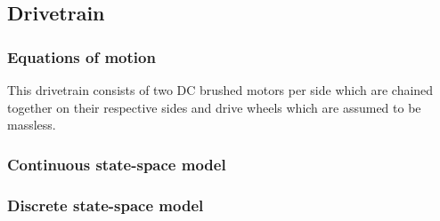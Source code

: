 \subsection{Drivetrain}

\subsubsection{Equations of motion}

This drivetrain consists of two DC brushed motors per side which are chained
together on their respective sides and drive wheels which are assumed to be
massless.

\subsubsection{Continuous state-space model}

\subsubsection{Discrete state-space model}
